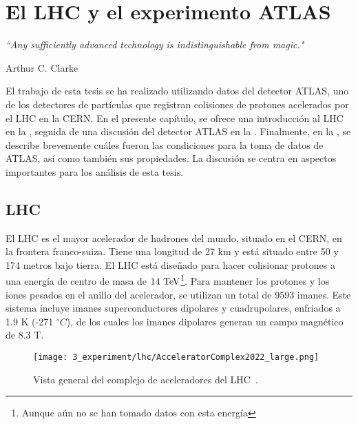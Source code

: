 \chapter{El LHC y el experimento ATLAS}
\label{ch:atlas}
\epigraph{\emph{``Any sufficiently advanced technology is indistinguishable from magic."}}{Arthur C. Clarke}



El trabajo de esta tesis se ha realizado utilizando datos del detector \ac{ATLAS}, uno de los detectores de partículas que registran colisiones de protones acelerados por el \acf{LHC} en la \ac{CERN}.
En el presente capítulo, se ofrece una introducción al \ac{LHC} en la \Sect{\ref{sec:atlas:LHC}}, seguida de una discusión del detector \ac{ATLAS} en la \Sect{\ref{sec:atlas:atlas}}. Finalmente, en la \Sect{\ref{sec:atlas:runs}}, se describe brevemente cuáles fueron las condiciones para la toma de datos de \ac{ATLAS}, así como también sus propiedades. La discusión se centra en aspectos importantes para los análisis de esta tesis.




\section{LHC}
\label{sec:atlas:LHC}

El \ac{LHC} \cite{LHC-TDR,LHC-Machine} es el mayor acelerador de hadrones del mundo, situado en el \ac{CERN}, en la frontera franco-suiza. Tiene una longitud de 27 km y está situado entre 50 y 174 metros bajo tierra.
El \ac{LHC} está diseñado para hacer colisionar protones a una energía de centro de masa de \(14~\text{TeV}\)\footnote{Aunque aún no se han tomado datos con esta energía}. Para mantener los protones y los iones pesados en el anillo del acelerador, se utilizan un total de 9593 imanes. Este sistema incluye imanes superconductores dipolares y cuadrupolares, enfriados a 1.9 K (-271 $^{\circ} C$), de los cuales los imanes dipolares generan un campo magnético de 8.3 T.

\begin{figure}[ht!]
    \centering
    \texttt{[image: 3\_experiment/lhc/AcceleratorComplex2022\_large.png]}
    \caption{Vista general del complejo de aceleradores del \ac{LHC}~\cite{LHC-complex}.}
    \label{fig:atlas:lhc:lhc}
\end{figure}

